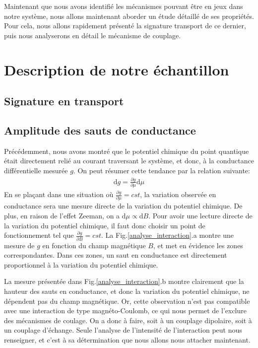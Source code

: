 Maintenant que nous avons identifié les mécanismes pouvant être en jeux dans notre système, nous allons maintenant aborder un étude détaillé de ses propriétés. Pour cela, nous allons rapidement présenté la signature transport de ce dernier, puis nous analyserons en détail le mécanisme de couplage.

\section{Description de notre échantillon}

\subsection{Signature en transport}



\subsection{Amplitude des sauts de conductance}
Précédemment, nous avons montré que le potentiel chimique du point quantique était directement relié au courant traversant le système, et donc, à la conductance différentielle mesurée $g$. On peut résumer cette tendance par la relation suivante:
\begin{eqnarray}
\text{d}g = \frac{\partial g}{\partial \mu} \text{d} \mu
\end{eqnarray}
En se plaçant dans une situation où $\frac{\partial g}{\partial \mu} = cst$, la variation observée en conductance sera une mesure directe de la variation du potentiel chimique. De plus, en raison de l'effet Zeeman, on a $\text{d}\mu \propto \text{d}B$. Pour avoir une lecture directe de la variation du potentiel chimique, il faut donc choisir un point de fonctionnement tel que $\frac{\partial g}{\partial B} = cst$. La Fig.\ref{analyse_interaction}.a montre une mesure de $g$ en fonction du champ magnétique $B$, et met en évidence les zones correspondantes. Dans ces zones, un saut en conductance est directement proportionnel à la variation du potentiel chimique. 

La mesure présentée dans Fig.\ref{analyse_interaction}.b montre clairement que la hauteur des sauts en conductance, et donc la variation du potentiel chimique, ne dépendent pas du champ magnétique. Or, cette observation n'est pas compatible avec une interaction de type magnéto-Coulomb, ce qui nous permet de l'exclure des mécanismes de coulage. On a donc à faire, soit à un couplage dipolaire, soit à un couplage d'échange. Seule l'analyse de l'intensité de l'interaction peut nous renseigner, et c'est à sa détermination que nous allons nous attacher maintenant.

